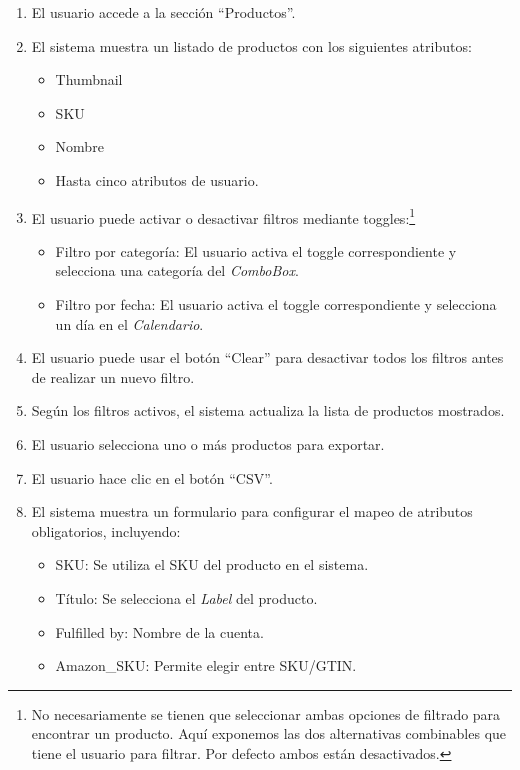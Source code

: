 \begin{enumerate}
    \item El usuario accede a la sección \enquote{Productos}.
    \item El sistema muestra un listado de productos con los siguientes atributos:
    \begin{itemize}
        \item Thumbnail
        \item SKU
        \item Nombre
        \item Hasta cinco atributos de usuario.
    \end{itemize}
    \item El usuario puede activar o desactivar filtros mediante toggles:\footnote{No necesariamente se tienen que seleccionar ambas opciones de filtrado para encontrar un producto. Aquí exponemos las dos alternativas combinables que tiene el usuario para filtrar. Por defecto ambos están desactivados.}
    \begin{itemize}
        \item Filtro por categoría: El usuario activa el toggle correspondiente y selecciona una categoría del \emph{ComboBox}.
        \item Filtro por fecha: El usuario activa el toggle correspondiente y selecciona un día en el \emph{Calendario}.
    \end{itemize}
    \item El usuario puede usar el botón \enquote{Clear} para desactivar todos los filtros antes de realizar un nuevo filtro.
    \item Según los filtros activos, el sistema actualiza la lista de productos mostrados.
    \item El usuario selecciona uno o más productos para exportar.
    \item El usuario hace clic en el botón \enquote{CSV}.
    \item El sistema muestra un formulario para configurar el mapeo de atributos obligatorios, incluyendo:
    \begin{itemize}
        \item SKU: Se utiliza el SKU del producto en el sistema.
        \item Título: Se selecciona el \textit{Label} del producto.
        \item Fulfilled by: Nombre de la cuenta.
        \item Amazon\_SKU: Permite elegir entre SKU/GTIN.

\end{itemize}
\end{enumerate}
